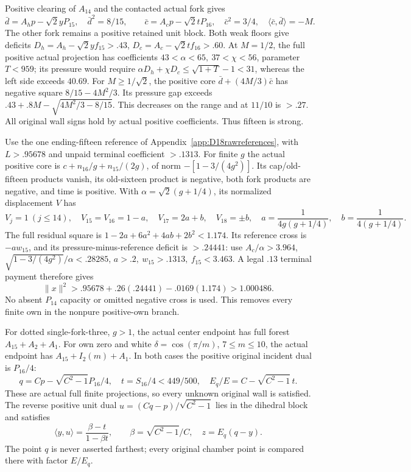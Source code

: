 \documentclass[11pt]{article}
\theoremstyle{definition}
\theoremstyle{remark}
\newcommand{\ip}[2]{\langle #1,#2\rangle}
\newcommand{\norm}[1]{\lVert #1\rVert}
\begin{document}
Positive clearing of \(A_{14}\) and the contacted actual fork gives
\[
 \bar d=A_hp-\sqrt2yP_{15},\quad \bar d^2=8/15,\qquad
 \bar c=A_cp-\sqrt2tP_{16},\quad \bar c^2=3/4,\quad
 \ip{\bar c}{\bar d}=-M .
\]
The other fork remains a positive retained unit block.
Both weak floors give deficits
\(D_h=A_h-\sqrt2y f_{15}>.43\),
\(D_c=A_c-\sqrt2t f_{16}>.60\).
At \(M=1/2\), the full positive actual projection has coefficients
\(43<\alpha<65,\ 37<\chi<56\), parameter \(T<959\);
its pressure would require
\(\alpha D_h+\chi D_c\leq\sqrt{1+T}-1<31\),
whereas the left side exceeds \(40.69\).
For \(M\geq1/\sqrt2\), the positive core
\(\bar d+(4M/3)\bar c\) has negative square
\(8/15-4M^2/3\).
Its pressure gap exceeds
\(.43+.8M-\sqrt{4M^2/3-8/15}\).
This decreases on the range and at \(11/10\) is \(>.27\).
All original wall signs hold by actual positive coefficients.
Thus fifteen is strong.

Use the one ending-fifteen reference of
Appendix~\ref{app:D18rawreferences}, with \(L>.95678\) and
unpaid terminal coefficient \(>.1313\).
For finite \(g\) the actual positive core is
\(c+n_{16}/g+n_{15}/(2g)\), of norm
\(-[1-3/(4g^2)]\).
Its cap/old-fifteen products vanish, its old-sixteen product is
negative, both fork products are negative, and time is positive.
With \(\alpha=\sqrt2(g+1/4)\), its normalized displacement \(V\)
has
\[
 V_j=1\ (j\leq14),\quad V_{15}=V_{16}=1-a,\quad
 V_{17}=2a+b,\quad V_{18}=\pm b,\quad
 a=\frac1{4g(g+1/4)},\quad b=\frac1{4(g+1/4)} .
\]
The full residual square is
\(1-2a+6a^2+4ab+2b^2<1.174\).
Its reference cross is \(-aw_{15}\), and its
pressure-minus-reference deficit is \(>.24441\):
use \(A_c/\alpha>3.964\),
\(\sqrt{1-3/(4g^2)}/\alpha<.28285\),
\(a>.2,\ w_{15}>.1313,\ f_{15}<3.463\).
A legal \(.13\) terminal payment therefore gives
\[
 \norm x^2>.95678+.26(.24441)-.0169(1.174)>1.000486.
\]
No absent \(P_{14}\) capacity or omitted negative cross is used.
This removes every finite own in the nonpure positive-own branch.

For dotted single-fork-three, \(g>1\), the actual center endpoint
has full forest \(A_{15}+A_2+A_1\).
For own zero and white \(\delta=\cos(\pi/m)\), \(7\leq m\leq10\),
the actual endpoint has \(A_{15}+I_2(m)+A_1\).
In both cases the positive original incident dual is \(P_{16}/4\):
\[
 q=Cp-\sqrt{C^2-1}P_{16}/4,\quad
 t=S_{16}/4<449/500,\quad E_q/E=C-\sqrt{C^2-1}\,t .
\]
These are actual full finite projections, so every unknown original
wall is satisfied. The reverse positive unit dual
\(u=(Cq-p)/\sqrt{C^2-1}\) lies in the dihedral block and satisfies
\[
 \ip yu=\frac{\beta-t}{1-\beta t},\qquad
 \beta=\sqrt{C^2-1}/C,\quad z=E_q(q-y).
\]
The point \(q\) is never asserted farthest; every original chamber
point is compared there with factor \(E/E_q\).
\end{document}
